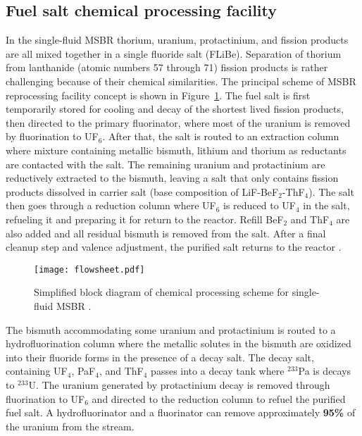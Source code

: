 \subsection{Fuel salt chemical processing facility} \label{sec:chemical_processing}
In the single-fluid \gls{MSBR} thorium, uranium, 
protactinium, and fission products are all mixed together in a single fluoride salt (FLiBe). Separation of thorium from lanthanide (atomic numbers 57 through 71) fission products is rather challenging because of their chemical similarities. The principal scheme of \gls{MSBR} reprocessing facility concept is shown in Figure~\ref{fig:material_flow}. The fuel salt is first temporarily stored for cooling and decay of the shortest lived fission products, then directed to the primary fluorinator, where most of the uranium is removed by fluorination to UF$_6$. After that, the salt is routed to an extraction column where mixture containing metallic bismuth, lithium and thorium as reductants are contacted with the salt. The remaining uranium and protactinium are reductively extracted to the bismuth, leaving a salt that only contains fission products dissolved in carrier salt (base composition of LiF-BeF$_2$-ThF$_4$). The salt then goes through a reduction column where UF$_6$ is reduced to UF$_4$ in the salt, refueling it and preparing it for return to the reactor. Refill BeF$_2$ and ThF$_4$ are also added and all residual bismuth is removed from the salt. After a final cleanup step and valence adjustment, the purified salt returns to the reactor \cite{carter_design_1972,sorensen_one-fluid_2006}.
\begin{figure}[htp!] %
  \centering
  \texttt{[image: flowsheet.pdf]}
  \caption{Simplified block diagram of chemical processing scheme for single-fluid \gls{MSBR} \cite{robertson_conceptual_1971, sorensen_one-fluid_2006}.}
  \label{fig:material_flow}
\end{figure}

The bismuth accommodating some uranium and protactinium is routed to a hydrofluorination column where the metallic solutes in the bismuth are oxidized into their fluoride forms in the presence of a decay salt. The decay salt, containing UF$_4$, PaF$_4$, and ThF$_4$ passes into a decay tank where $^{233}$Pa is decays to $^{233}$U. The uranium generated by protactinium decay is removed through fluorination to UF$_6$ and directed to the reduction column to refuel the purified fuel salt. A hydrofluorinator and a fluorinator can remove approximately \textbf{95\%} of the uranium from the stream.

